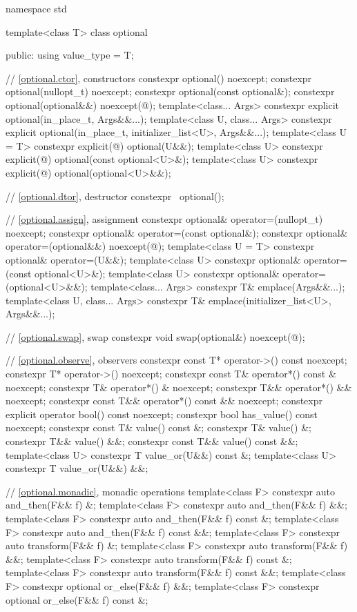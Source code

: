 %
%
\begin{codeblock}
namespace std {
  template<class T>
  class optional {
  public:
    using value_type = T;

    // \ref{optional.ctor}, constructors
    constexpr optional() noexcept;
    constexpr optional(nullopt_t) noexcept;
    constexpr optional(const optional&);
    constexpr optional(optional&&) noexcept(@\seebelow@);
    template<class... Args>
      constexpr explicit optional(in_place_t, Args&&...);
    template<class U, class... Args>
      constexpr explicit optional(in_place_t, initializer_list<U>, Args&&...);
    template<class U = T>
      constexpr explicit(@\seebelow@) optional(U&&);
    template<class U>
      constexpr explicit(@\seebelow@) optional(const optional<U>&);
    template<class U>
      constexpr explicit(@\seebelow@) optional(optional<U>&&);

    // \ref{optional.dtor}, destructor
    constexpr ~optional();

    // \ref{optional.assign}, assignment
    constexpr optional& operator=(nullopt_t) noexcept;
    constexpr optional& operator=(const optional&);
    constexpr optional& operator=(optional&&) noexcept(@\seebelow@);
    template<class U = T> constexpr optional& operator=(U&&);
    template<class U> constexpr optional& operator=(const optional<U>&);
    template<class U> constexpr optional& operator=(optional<U>&&);
    template<class... Args> constexpr T& emplace(Args&&...);
    template<class U, class... Args> constexpr T& emplace(initializer_list<U>, Args&&...);

    // \ref{optional.swap}, swap
    constexpr void swap(optional&) noexcept(@\seebelow@);

    // \ref{optional.observe}, observers
    constexpr const T* operator->() const noexcept;
    constexpr T* operator->() noexcept;
    constexpr const T& operator*() const & noexcept;
    constexpr T& operator*() & noexcept;
    constexpr T&& operator*() && noexcept;
    constexpr const T&& operator*() const && noexcept;
    constexpr explicit operator bool() const noexcept;
    constexpr bool has_value() const noexcept;
    constexpr const T& value() const &;
    constexpr T& value() &;
    constexpr T&& value() &&;
    constexpr const T&& value() const &&;
    template<class U> constexpr T value_or(U&&) const &;
    template<class U> constexpr T value_or(U&&) &&;

    // \ref{optional.monadic}, monadic operations
    template<class F> constexpr auto and_then(F&& f) &;
    template<class F> constexpr auto and_then(F&& f) &&;
    template<class F> constexpr auto and_then(F&& f) const &;
    template<class F> constexpr auto and_then(F&& f) const &&;
    template<class F> constexpr auto transform(F&& f) &;
    template<class F> constexpr auto transform(F&& f) &&;
    template<class F> constexpr auto transform(F&& f) const &;
    template<class F> constexpr auto transform(F&& f) const &&;
    template<class F> constexpr optional or_else(F&& f) &&;
    template<class F> constexpr optional or_else(F&& f) const &;

}}
\end{codeblock}

